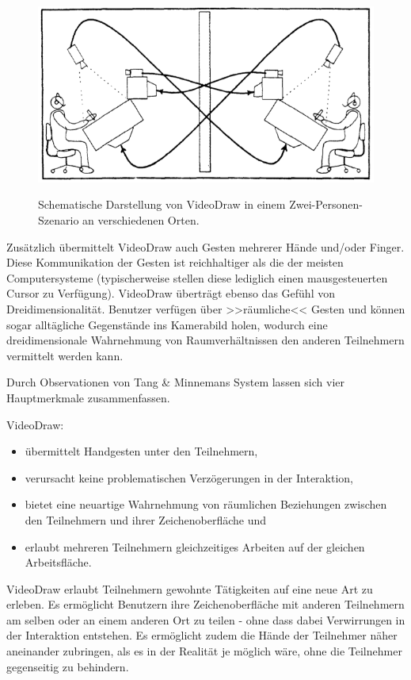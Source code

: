 \begin{figure}[bth]
	{\includegraphics[width=\linewidth]{gfx/tangVideoDraw}}
	\caption[VideoDraw \newline \citep{Tang:1991p28}]{Schematische Darstellung von VideoDraw in einem Zwei-Personen-Szenario an verschiedenen Orten.}
	\label{fig:tangVideoDraw}
\end{figure}

\newpage Zusätzlich übermittelt VideoDraw auch Gesten mehrerer Hände und/oder Finger. Diese Kommunikation der Gesten ist reichhaltiger als die der meisten Computersysteme (typischerweise stellen diese lediglich einen mausgesteuerten Cursor zu Verfügung). VideoDraw überträgt ebenso das Gefühl von Dreidimensionalität.
Benutzer verfügen über >>räumliche<< Gesten und können sogar alltägliche Gegenstände ins Kamerabild holen, wodurch eine dreidimensionale Wahrnehmung von Raumverhältnissen den anderen Teilnehmern vermittelt werden kann.

\medskip Durch Observationen von Tang \& Minnemans System lassen sich vier Hauptmerkmale zusammenfassen.

\medskip VideoDraw:
\begin{itemize}
	\item übermittelt Handgesten unter den Teilnehmern,
	\item verursacht keine problematischen Verzögerungen in der Interaktion,
	\item bietet eine neuartige Wahrnehmung von räumlichen Beziehungen zwischen den Teilnehmern und ihrer Zeichenoberfläche und
	\item erlaubt mehreren Teilnehmern gleichzeitiges Arbeiten auf der gleichen Arbeitsfläche.
\end{itemize}

VideoDraw erlaubt Teilnehmern gewohnte Tätigkeiten auf eine neue Art zu erleben. Es ermöglicht Benutzern ihre Zeichenoberfläche mit anderen Teilnehmern am selben oder an einem anderen Ort zu teilen - ohne dass dabei Verwirrungen in der Interaktion entstehen. Es ermöglicht zudem die Hände der Teilnehmer näher aneinander zubringen, als es in der Realität je möglich wäre, ohne die Teilnehmer gegenseitig zu behindern. \citep{Tang:1991p28}
\clearpage
